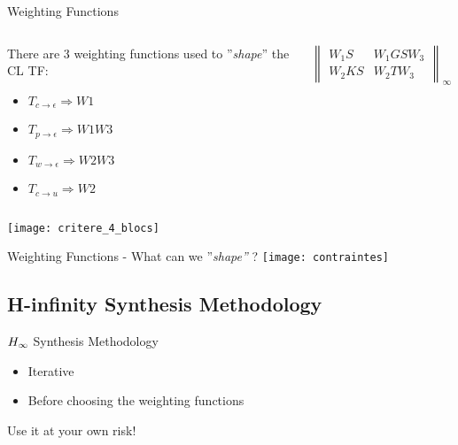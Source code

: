\documentclass[../main/main.tex]{subfiles}
\begin{document}
\begin{frame}{Weighting Functions}
  \centering
  \begin{columns}
    \begin{column}{0.5\textwidth}
      There are 3 weighting functions used to ''\emph{shape}'' the CL TF:
      \begin{itemize}
      \item \(T_{c \rightarrow \epsilon} \Longrightarrow W1\)
      \item \(T_{p \rightarrow \epsilon} \Longrightarrow W1 W3\)
      \item \(T_{w \rightarrow \epsilon} \Longrightarrow W2 W3\)
      \item \(T_{c \rightarrow u} \Longrightarrow W2\)
      \end{itemize}
    \end{column}
    \begin{column}{0.5\textwidth}
      \begin{tcolorbox}[size=small, top=4pt,
        colback=red!5!white,colframe=red!75!black,title=Global \(\hinf\) criteria]
        \vspace{-1em}
        \[
          \begin{Vmatrix}
            W_1 S & W_1 GS W_3 \\
            W_2 KS & W_2 T W_3
          \end{Vmatrix}_{\infty} < 1
        \]
      \end{tcolorbox}
    \end{column}
  \end{columns}
  \texttt{[image: critere\_4\_blocs]}
\end{frame}


\begin{frame}{Weighting Functions - What can we ''\emph{shape''} ?}
  \centering
  \texttt{[image: contraintes]}
\end{frame}


\subsection{H-infinity Synthesis Methodology}

\begin{frame}{\(\hinf\) Synthesis Methodology}
  \centering
  \begin{itemize}
  \item Iterative
  \item Before choosing the weighting functions
  \end{itemize}
  \begin{tcolorbox}[size=small, top=4pt,
    colback=blue!5!white,colframe=blue!75!black,title=This is my own methodology]
    Use it at your own risk!
  \end{tcolorbox}
\end{frame}
\end{document}

